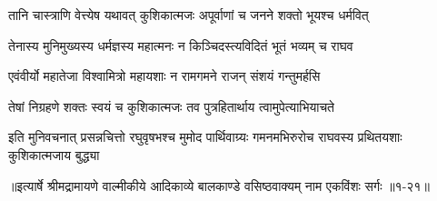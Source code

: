 \twolineshloka
{तानि चास्त्राणि वेत्त्येष यथावत् कुशिकात्मजः}
{अपूर्वाणां च जनने शक्तो भूयश्च धर्मवित्} %

\twolineshloka
{तेनास्य मुनिमुख्यस्य धर्मज्ञस्य महात्मनः}
{न किञ्चिदस्त्यविदितं भूतं भव्यम् च राघव} %

\twolineshloka
{एवंवीर्यो महातेजा विश्वामित्रो महायशाः}
{न रामगमने राजन् संशयं गन्तुमर्हसि} %

\twolineshloka
{तेषां निग्रहणे शक्तः स्वयं च कुशिकात्मजः}
{तव पुत्रहितार्थाय त्वामुपेत्याभियाचते} %

\twolineshloka
{इति मुनिवचनात् प्रसन्नचित्तो रघुवृषभश्च मुमोद पार्थिवाग्र्यः}
{गमनमभिरुरोच राघवस्य प्रथितयशाः कुशिकात्मजाय बुद्ध्या} %


॥इत्यार्षे श्रीमद्रामायणे वाल्मीकीये आदिकाव्ये बालकाण्डे वसिष्ठवाक्यम् नाम एकविंशः सर्गः ॥१-२१॥
